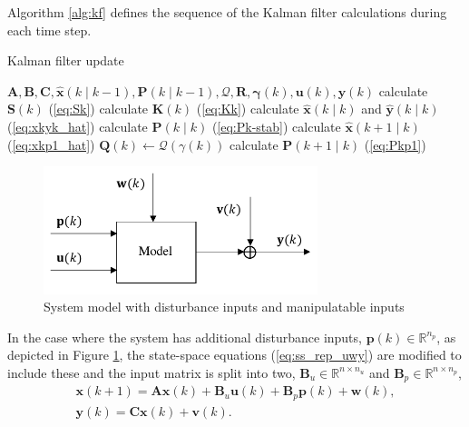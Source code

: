 Algorithm \ref{alg:kf} defines the sequence of the Kalman filter calculations during each time step.
\begin{algorithm}
	\caption{Kalman filter update}\label{alg:kf}
	\begin{algorithmic}
		\Require $\mathbf{A},\mathbf{B},\mathbf{C},\mathbf{\hat{x}}(k \mid k-1), \mathbf{P}(k \mid k-1), \mathcal{Q}, \mathbf{R}, \mathbf{\gamma}(k), \mathbf{u}(k), \mathbf{y}(k)$
		\State calculate $\mathbf{S}(k)$ (\ref{eq:Sk})
		\State calculate $\mathbf{K}(k)$ (\ref{eq:Kk})
		\State calculate $\mathbf{\hat{x}}(k \mid k)$ and $\mathbf{\hat{y}}(k \mid k)$ (\ref{eq:xkyk_hat})
		\State calculate $\mathbf{P}(k \mid k)$ (\ref{eq:Pk-stab})
		\State calculate $\mathbf{\hat{x}}(k+1 \mid k)$ (\ref{eq:xkp1_hat})
		\State $\mathbf{Q}(k) \gets \mathcal{Q}(\gamma(k))$
		\State calculate $\mathbf{P}(k+1 \mid k)$ (\ref{eq:Pkp1})
	\end{algorithmic}
\end{algorithm}

\begin{figure}[htp]
	\centering
	\includegraphics[width=8cm]{images/model_diag_upwvy.pdf}
	\caption{System model with disturbance inputs and manipulatable inputs}
	\label{fig:model_diag_upwvy}
\end{figure}
In the case where the system has additional disturbance inputs, $\mathbf{p}(k) \in \mathbb{R}^{n_p}$, as depicted in Figure \ref{fig:model_diag_upwvy}, the state-space equations (\ref{eq:ss_rep_uwy}) are modified to include these and the input matrix is split into two, $\mathbf{B}_u \in \mathbb{R}^{n \times n_u}$ and $\mathbf{B}_p \in \mathbb{R}^{n \times n_p}$,
\begin{equation} \label{eq:ss_rep_upwy}
	\begin{aligned}
		\mathbf{x}(k+1) = \mathbf{A} \mathbf{x}(k) + \mathbf{B}_u \mathbf{u}(k) + \mathbf{B}_p \mathbf{p}(k) + \mathbf{w}(k), \\
		\mathbf{y}(k) = \mathbf{C} \mathbf{x}(k) + \mathbf{v}(k).
	\end{aligned}
\end{equation}

